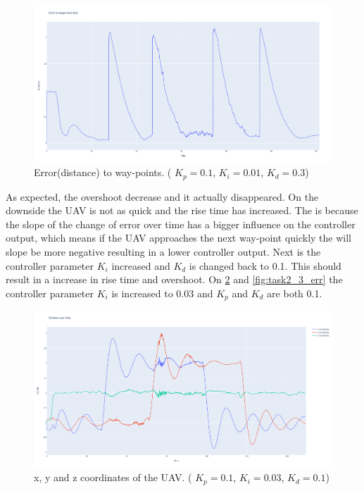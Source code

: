 \documentclass[conference]{IEEEtran}
\begin{document}
\begin{figure}[hbtp]
	\centering
	\includegraphics[width=1.0\linewidth]{images/task2_4_err.png}
	\caption{Error(distance) to way-points. ( $K_p = 0.1$, $K_i = 0.01$, $K_d = 0.3$)}
	\label{fig:task2_4_err}
\end{figure}

As expected, the overshoot decrease and it actually disappeared. On the downside the UAV is not as quick  and the rise time has increased. The is because the slope of the change of error over time has a bigger influence on the controller output, which means if the UAV approaches the next way-point quickly the will slope be more negative resulting in a lower controller output. 
Next is the controller parameter $K_i$ increased and $K_d$ is changed back to 0.1. This should result in a increase in rise time and overshoot. On \cref{fig:task2_3_pos} and \cref{fig:task2_3_err} the controller parameter $K_i$ is increased to 0.03 and $K_p$ and $K_d$ are both 0.1. 

\begin{figure}[hbtp]
	\centering
	\includegraphics[width=1.0\linewidth]{images/task2_3_pos.png}
	\caption{x, y and z coordinates of the UAV. ( $K_p = 0.1$, $K_i = 0.03$, $K_d = 0.1$)}
	\label{fig:task2_3_pos}
\end{figure}
\end{document}
